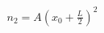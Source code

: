 \documentclass[preview]{standalone}
\begin{document}
\begin{align*}
n_2 = A\!\left(x_0 + \tfrac{L}{2}\right)^2
\end{align*}
\end{document}
